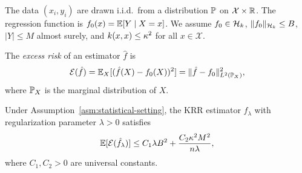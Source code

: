 \documentclass[11pt,a4paper]{article}
\begin{document}
\begin{assumption}
\label{asm:statistical-setting}
The data $(x_i, y_i)$ are drawn i.i.d.\ from a distribution
$\mathbb{P}$ on $\mathcal{X} \times \mathbb{R}$. The regression function is
$f_0(x) = \mathbb{E}[Y \mid X = x]$. We assume $f_0 \in \mathcal{H}_k$,
$\|f_0\|_{\mathcal{H}_k} \le B$, $|Y| \le M$ almost surely, and
$k(x, x) \le \kappa^2$ for all $x \in \mathcal{X}$.
\end{assumption}

\begin{definition}
\label{def:excess-risk}
The \emph{excess risk} of an estimator $\hat{f}$ is
\begin{equation}
\label{eq:excess-risk}
\mathcal{E}(\hat{f}) = \mathbb{E}_X[(\hat{f}(X) - f_0(X))^2]
= \|\hat{f} - f_0\|_{L^2(\mathbb{P}_X)}^2,
\end{equation}
where $\mathbb{P}_X$ is the marginal distribution of $X$.
\end{definition}

\begin{theorem}
\label{thm:krr-risk}
Under Assumption~\ref{asm:statistical-setting}, the KRR
estimator $\hat{f}_\lambda$ with regularization parameter
$\lambda > 0$ satisfies
\begin{equation}
\label{eq:krr-risk-bound}
\mathbb{E}[\mathcal{E}(\hat{f}_\lambda)] \le C_1 \lambda B^2 +
\frac{C_2 \kappa^2 M^2}{n \lambda},
\end{equation}
where $C_1, C_2 > 0$ are universal constants.
\end{theorem}
\end{document}
